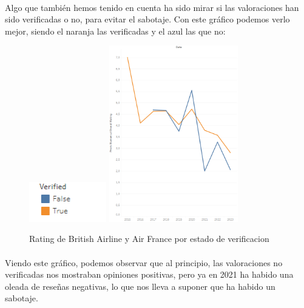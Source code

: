 \documentclass{report}
\begin{document}
            \paragraph*{}{
            Algo que también hemos tenido en cuenta ha sido mirar si las valoraciones han sido verificadas o no, para evitar el sabotaje. Con este gráfico podemos verlo mejor, siendo el naranja las verificadas y el azul las que no:
            }
            \begin{figure}[H]
                \centering
                \includegraphics[width=0.3\textwidth]{img/Guion4.png}
                \includegraphics[width=0.5\textwidth]{img/Verified.png}
                \caption{Rating de British Airline y Air France por estado de verificacion}
            \end{figure}
            

            
            \paragraph*{}{
            Viendo este gráfico, podemos observar que al principio, las valoraciones no verificadas nos mostraban opiniones positivas, pero ya en 2021 ha habido una oleada de reseñas negativas, lo que nos lleva a suponer que ha habido un sabotaje.
            }
\end{document}
